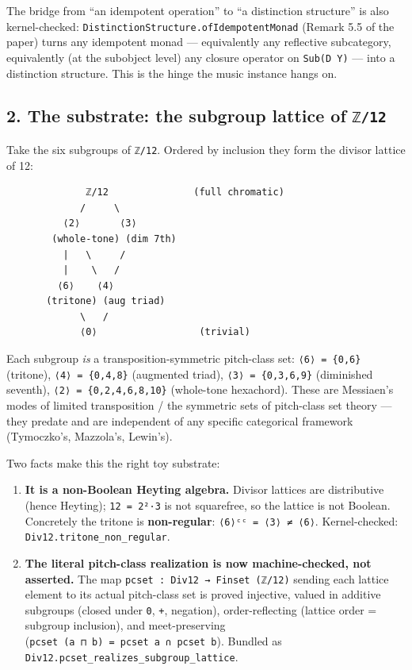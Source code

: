 \documentclass[
  11pt,
]{article}
\providecommand{\tightlist}{%
  \setlength{\itemsep}{0pt}\setlength{\parskip}{0pt}}
\begin{document}
The bridge from ``an idempotent operation'' to ``a distinction
structure'' is also kernel-checked:
\texttt{DistinctionStructure.ofIdempotentMonad} (Remark 5.5 of the
paper) turns any idempotent monad --- equivalently any reflective
subcategory, equivalently (at the subobject level) any closure operator
on \texttt{Sub(D\ Y)} --- into a distinction structure. This is the
hinge the music instance hangs on.

\subsection{\texorpdfstring{2. The substrate: the subgroup lattice of
\texttt{ℤ/12}}{2. The substrate: the subgroup lattice of ℤ/12}}\label{the-substrate-the-subgroup-lattice-of-ux212412}

Take the six subgroups of \texttt{ℤ/12}. Ordered by inclusion they form
the divisor lattice of 12:

\begin{verbatim}
              ℤ/12               (full chromatic)
             /     \
          ⟨2⟩       ⟨3⟩
        (whole-tone) (dim 7th)
          |   \     /
          |    \   /
         ⟨6⟩    ⟨4⟩
       (tritone) (aug triad)
             \   /
             ⟨0⟩                  (trivial)
\end{verbatim}

Each subgroup \emph{is} a transposition-symmetric pitch-class set:
\texttt{⟨6⟩\ =\ \{0,6\}} (tritone), \texttt{⟨4⟩\ =\ \{0,4,8\}}
(augmented triad), \texttt{⟨3⟩\ =\ \{0,3,6,9\}} (diminished seventh),
\texttt{⟨2⟩\ =\ \{0,2,4,6,8,10\}} (whole-tone hexachord). These are
Messiaen's modes of limited transposition / the symmetric sets of
pitch-class set theory --- they predate and are independent of any
specific categorical framework (Tymoczko's, Mazzola's, Lewin's).

Two facts make this the right toy substrate:

\begin{enumerate}
\def\labelenumi{\arabic{enumi}.}
\tightlist
\item
  \textbf{It is a non-Boolean Heyting algebra.} Divisor lattices are
  distributive (hence Heyting); \texttt{12\ =\ 2²·3} is not squarefree,
  so the lattice is not Boolean. Concretely the tritone is
  \textbf{non-regular}: \texttt{⟨6⟩ᶜᶜ\ =\ ⟨3⟩\ ≠\ ⟨6⟩}. Kernel-checked:
  \texttt{Div12.tritone\_non\_regular}.
\item
  \textbf{The literal pitch-class realization is now machine-checked,
  not asserted.} The map \texttt{pcset\ :\ Div12\ →\ Finset\ (ℤ/12)}
  sending each lattice element to its actual pitch-class set is proved
  injective, valued in additive subgroups (closed under \texttt{0},
  \texttt{+}, negation), order-reflecting (lattice order = subgroup
  inclusion), and meet-preserving
  (\texttt{pcset\ (a\ ⊓\ b)\ =\ pcset\ a\ ∩\ pcset\ b}). Bundled as
  \texttt{Div12.pcset\_realizes\_subgroup\_lattice}.
\end{enumerate}
\end{document}
